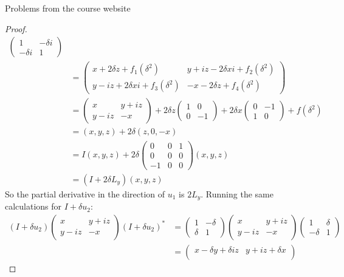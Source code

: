 \documentclass[12pt]{article}
\theoremstyle{definition}
\begin{document}
\begin{section}{Problems from the course website}
\begin{proof}
\begin{align*}
\begin{pmatrix}
		1 & -\delta i\\ -\delta i & 1
	\end{pmatrix}\\
	&= \begin{pmatrix}
		x + 2\delta z + f_1(\delta^2) & y + iz -2\delta xi + f_2(\delta^2)\\
		y - iz  + 2\delta xi + f_3(\delta^2)& -x  - 2\delta z + f_4(\delta^2)
	\end{pmatrix}\\
	&= \begin{pmatrix}
		x & y + iz \\
		y - iz & -x
	\end{pmatrix} + 2\delta z\begin{pmatrix}
		1 & 0 \\ 0 & -1
	\end{pmatrix} + 2\delta x \begin{pmatrix}
		0 & -1 \\ 1 & 0	
	\end{pmatrix} + f(\delta^2)\\
	&= (x,y,z) + 2\delta (z, 0, -x)\\
	&= I(x,y,z) + 2\delta \begin{pmatrix}
		0 & 0 & 1\\
		0 & 0 & 0\\
		-1 & 0 & 0
	\end{pmatrix}(x,y,z)\\
	&= ( I + 2\delta L_y)(x,y,z)
\end{align*}
So the partial derivative in the direction of $u_1$ is $2L_y$. Running the same calculations for $I + \delta u_2$:
\begin{align*}
	(I + \delta u_2) \begin{pmatrix}
		x & y + iz \\ y - iz & -x		
	\end{pmatrix}(I + \delta u_2)^* &= \begin{pmatrix}
		1 & -\delta\\ \delta & 1
	\end{pmatrix}\begin{pmatrix}
		x & y + iz \\ y - iz & -x		
	\end{pmatrix} \begin{pmatrix}1 & \delta\\-\delta & 1\end{pmatrix}\\
	&= \begin{pmatrix}
		x - \delta y + \delta  i z & y + iz  + \delta x \\

\end{pmatrix}
\end{align*}
\end{proof}
\end{section}
\end{document}
